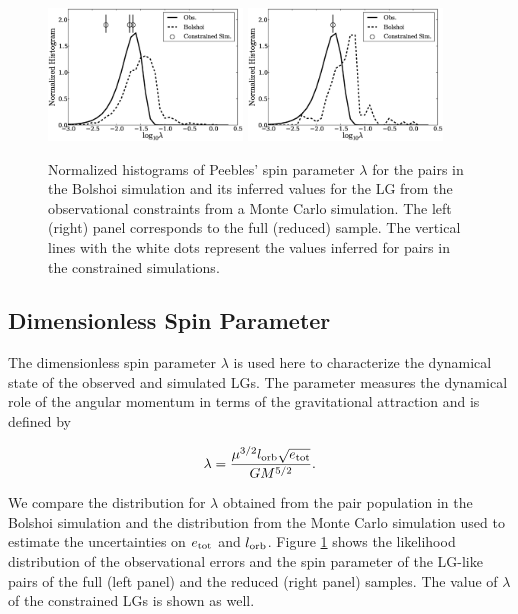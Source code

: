 \documentclass{emulateapj}
\begin{document}
\begin{figure}
\begin{center}
\includegraphics[keepaspectratio=true,width=0.46\textwidth]{fig_2a.eps}
\includegraphics[keepaspectratio=true,width=0.46\textwidth]{fig_2b.eps}
\caption{{\rm \label{fig:lambda} Normalized histograms of Peebles'
    spin parameter $\lambda$ for the pairs in the Bolshoi simulation
    and its inferred values for the LG from the observational
    constraints from a Monte Carlo simulation. The left (right) panel
    corresponds to the full (reduced) sample. The vertical lines with
    the white dots   represent the values inferred for pairs in the
    constrained 
    simulations.}} 
\label{fig:lambda}
\end{center}
\end{figure}



\subsection{Dimensionless Spin Parameter}

The dimensionless 
spin parameter $\lambda$ \citep{Peebles1971} is used here to
characterize the dynamical state of the observed and simulated
LGs. The parameter measures the dynamical role of the angular momentum
in terms of the gravitational attraction and is defined by 

\begin{equation}
\lambda = \frac{\mu^{3/2} l_{\rm orb} \sqrt{e_{\rm tot}}}{G M^{5/2}}.
\end{equation}

We compare the distribution for  $\lambda$ obtained from the pair
population in the Bolshoi simulation and the distribution from the  Monte Carlo
simulation used to estimate the uncertainties on $e_{\rm tot}$ and $l_{\rm orb}$. 
Figure \ref{fig:lambda} shows the likelihood distribution of the
observational errors and the spin parameter of the LG-like pairs of
the full (left panel) and the reduced (right panel) samples.  The value
of $\lambda$ of the constrained LGs is shown as well.  
\end{document}
